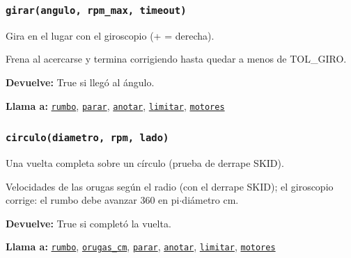\subsubsection{\texttt{girar(angulo, rpm\_\allowbreak{}max, timeout)}}\label{fn:calibrations:girar}
\noindent Gira en el lugar con el giroscopio (+ = derecha).

Frena al acercarse y termina corrigiendo hasta quedar a menos de TOL\_GIRO.

\par{}\par\smallskip
\noindent\textbf{Devuelve:} True si llegó al ángulo.\par
\noindent\textbf{Llama a:} \hyperref[fn:calibrations:rumbo]{\texttt{rumbo}}, \hyperref[fn:calibrations:parar]{\texttt{parar}}, \hyperref[fn:calibrations:anotar]{\texttt{anotar}}, \hyperref[fn:calibrations:limitar]{\texttt{limitar}}, \hyperref[fn:calibrations:motores]{\texttt{motores}}\par

\subsubsection{\texttt{circulo(diametro, rpm, lado)}}\label{fn:calibrations:circulo}
\noindent Una vuelta completa sobre un círculo (prueba de derrape SKID).

Velocidades de las orugas según el radio (con el derrape SKID); el giroscopio corrige: el rumbo debe avanzar 360\textdegree{} en pi\(\cdot\)diámetro cm.

\par{}\par\smallskip
\noindent\textbf{Devuelve:} True si completó la vuelta.\par
\noindent\textbf{Llama a:} \hyperref[fn:calibrations:rumbo]{\texttt{rumbo}}, \hyperref[fn:calibrations:orugas-cm]{\texttt{orugas\_\allowbreak{}cm}}, \hyperref[fn:calibrations:parar]{\texttt{parar}}, \hyperref[fn:calibrations:anotar]{\texttt{anotar}}, \hyperref[fn:calibrations:limitar]{\texttt{limitar}}, \hyperref[fn:calibrations:motores]{\texttt{motores}}\par

